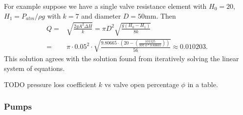 \documentclass[12pt]{article}
\begin{document}
For example suppose we have a single valve resistance element with $H_0 = 20$, $H_1 = P_{atm} / \rho g$ with $k = 7$ and diameter $D = 50$mm. Then 
\begin{align}
Q =& \sqrt{\frac{2gA^2 \Delta H}{k}} = \pi D^2 \sqrt{\frac{g \left(H_0 - H_1 \right)}{8k}} \nonumber \\ =& \pi \cdot 0.05^2 \cdot \sqrt{\frac{9.80665 \cdot \left(20 - \left( \frac{101325}{ 997.0 * 9.80665} \right) \right)}{56}} \approx 0.010203.
\end{align} 
This solution agrees with the solution found from iteratively solving the linear system of equations. 

{\color{red} TODO pressure loss coefficient $k$ vs valve open percentage $\phi$ in a table.}

\subsubsection{Pumps}
\end{document}
